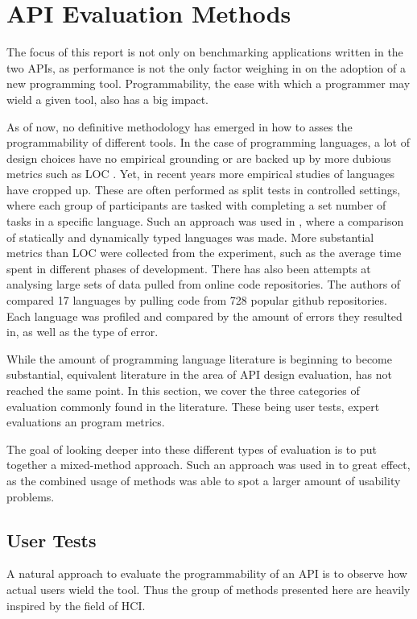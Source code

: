 \section{\gls{API} Evaluation Methods}\label{sec:apimethods}
The focus of this report is not only on benchmarking applications written in the two \glspl{API}, as performance is not the only factor weighing in on the adoption of a new programming tool.
Programmability, the ease with which a programmer may wield a given tool, also has a big impact.

As of now, no definitive methodology has emerged in how to asses the programmability of different tools.
In the case of programming languages, a lot of design choices have no empirical grounding or are backed up by more dubious metrics such as \gls{LOC} \cite{markstrum2010staking}.
Yet, in recent years more empirical studies of languages have cropped up.
These are often performed as split tests in controlled settings, where each group of participants are tasked with completing a set number of tasks in a specific language.
Such an approach was used in \cite{hanenberg2010experiment}, where a comparison of statically and dynamically typed languages was made.
More substantial metrics than \gls{LOC} were collected from the experiment, such as the average time spent in different phases of development.
There has also been attempts at analysing large sets of data pulled from online code repositories.
The authors of \cite{ray2014large} compared 17 languages by pulling code from 728 popular github repositories.
Each language was profiled and compared by the amount of errors they resulted in, as well as the type of error.

While the amount of programming language literature is beginning to become substantial, equivalent literature in the area of \gls{API} design evaluation, has not reached the same point.
In this section, we cover the three categories of evaluation commonly found in the literature.
These being user tests, expert evaluations an program metrics.     

The goal of looking deeper into these different types of evaluation is to put together a mixed-method approach.
Such an approach was used in \cite{grill2012methods} to great effect, as the combined usage of methods was able to spot a larger amount of usability problems.


\subsection{User Tests}
A natural approach to evaluate the programmability of an \gls{API} is to observe how actual users wield the tool.
Thus the group of methods presented here are heavily inspired by the field of \gls{HCI}. 

